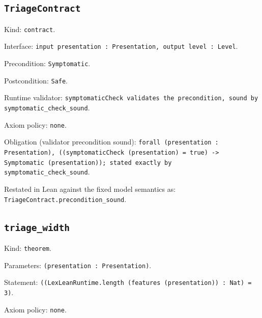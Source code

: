 \documentclass[11pt]{article}
\begin{document}
\subsection*{\texttt{TriageContract}}
\noindent Kind: \texttt{contract}.\par
\noindent Interface: \texttt{input presentation : Presentation, output level : Level}.\par
\noindent Precondition: \texttt{Symptomatic}.\par
\noindent Postcondition: \texttt{Safe}.\par
\noindent Runtime validator: \texttt{symptomaticCheck validates the precondition, sound by symptomatic\_check\_sound}.\par
\noindent Axiom policy: \texttt{none}.\par
\noindent Obligation (validator precondition sound): \texttt{forall (presentation : Presentation), ((symptomaticCheck (presentation) = true) -> Symptomatic (presentation)); stated exactly by symptomatic\_check\_sound}.\par
\noindent Restated in Lean against the fixed model semantics as: \texttt{TriageContract.precondition\_sound}.\par
\subsection*{\texttt{triage\_width}}
\noindent Kind: \texttt{theorem}.\par
\noindent Parameters: \texttt{(presentation : Presentation)}.\par
\noindent Statement: \texttt{((LexLeanRuntime.length (features (presentation)) : Nat) = 3)}.\par
\noindent Axiom policy: \texttt{none}.\par
\end{document}
